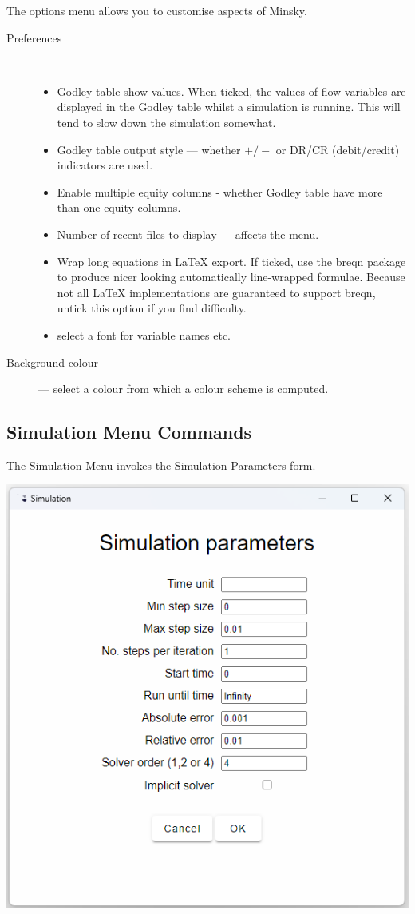 The options menu allows you to customise aspects of Minsky.
\begin{description}
\item [{Preferences}]~
\begin{itemize}
\item Godley table show values. When ticked, the values of flow variables
are displayed in the Godley table whilst a simulation is running.
This will tend to slow down the simulation somewhat. 
\item Godley table output style --- whether $+/-$ or DR/CR (debit/credit)
indicators are used. 
\item Enable multiple equity columns - whether Godley table have more than
one equity columns. 
\item Number of recent files to display --- affects the  menu. 
\item \label{wrap-equations-1} Wrap long equations in LaTeX export. If
ticked, use the breqn package to produce nicer looking automatically
line-wrapped formulae. Because not all LaTeX implementations are guaranteed
to support breqn, untick this option if you find difficulty. 
\item \label{font-1} select a font for variable names etc. 
\end{itemize}
\item [{Background colour}] --- select a colour from which a colour scheme
is computed.
\end{description}

\subsection{Simulation Menu Commands}

\label{RungeKutta}

The Simulation Menu invokes the Simulation Parameters form.

\noindent\includegraphics[width=\textwidth]{images/SimulationParameters}

